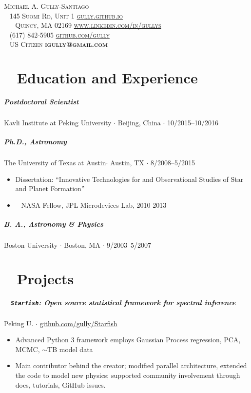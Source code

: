 \documentclass[10pt,letterpaper]{article}
\newcommand{\namestyle}{\Huge \scshape}
\newcommand{\addressstyle}{\color{addresscolor}  \footnotesize \sffamily \upshape}
\begin{document}
\begin{flushleft}
    \namestyle Michael A. Gully-Santiago \\[0.3em]
    \addressstyle 
    \faMapMarker ~ 145 Suomi Rd, Unit 1  \hfill \url{gully.github.io} ~ \faExternalLink \\
    ~ ~ Quincy, MA 02169  \hfill  \url{www.linkedin.com/in/gullys} ~ \faLinkedin \\
    \faPhone ~ (617) 842-5905 \hfill \url{github.com/gully} ~ \faGithub \\
    \faGlobe ~ US Citizen \hfill \textbf{igully@gmail.com} ~ \faInbox\\

\end{flushleft}

\small

\section*{\faInstitution ~ Education and Experience}

\subparagraph{Postdoctoral Scientist}
Kavli Institute at Peking University $\cdot$ Beijing, China $\cdot$ 10/2015--10/2016

\subparagraph{\textbf{Ph.D}., Astronomy}
The University of Texas at Austin$\cdot$ Austin, TX $\cdot$ 8/2008--5/2015
\begin{itemize}
    \item Dissertation: ``Innovative Technologies for and Observational Studies of Star and Planet Formation''
    \item \faRocket ~ NASA Fellow, JPL Microdevices Lab, 2010-2013
\end{itemize}

\subparagraph{\textbf{B. A.}, Astronomy \& Physics}
Boston University $\cdot$ Boston, MA $\cdot$ 9/2003--5/2007

\section*{\faLineChart ~ Projects}

\subparagraph{\faCodeFork ~ \texttt{Starfish}: Open source statistical framework for spectral inference}
Peking U. $\cdot$ \href{https://github.com/gully/Starfish}{github.com/gully/Starfish}
\begin{itemize}
    \item Advanced Python 3 framework employs Gaussian Process regression, PCA, MCMC, $\sim$TB model data
    \item Main contributor behind the creator; modified parallel architecture, extended the code to model new physics; supported community involvement through docs, tutorials, GitHub issues.
\end{itemize}
\end{document}
